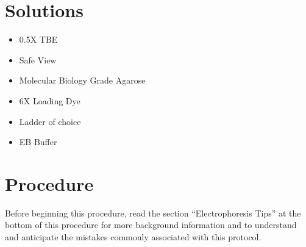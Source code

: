 \documentclass[
  letterpaper,
  DIV=11,
  numbers=noendperiod]{scrreprt}
\providecommand{\tightlist}{%
  \setlength{\itemsep}{0pt}\setlength{\parskip}{0pt}}\usepackage{longtable,booktabs,array}
\begin{document}
\hypertarget{solutions-20}{%
\section{Solutions}\label{solutions-20}}

\begin{itemize}
\tightlist
\item
  0.5X TBE
\item
  Safe View
\item
  Molecular Biology Grade Agarose
\item
  6X Loading Dye
\item
  Ladder of choice
\item
  EB Buffer
\end{itemize}

\hypertarget{procedure-22}{%
\section{Procedure}\label{procedure-22}}

\begin{tcolorbox}[enhanced jigsaw, toprule=.15mm, breakable, coltitle=black, leftrule=.75mm, title=\textcolor{quarto-callout-important-color}{\faExclamation}\hspace{0.5em}{This is important}, bottomrule=.15mm, toptitle=1mm, bottomtitle=1mm, colframe=quarto-callout-important-color-frame, opacityback=0, colback=white, opacitybacktitle=0.6, colbacktitle=quarto-callout-important-color!10!white, rightrule=.15mm, titlerule=0mm, arc=.35mm, left=2mm]

Before beginning this procedure, read the section ``Electrophoresis
Tips'' at the bottom of this procedure for more background information
and to understand and anticipate the mistakes commonly associated with
this protocol.

\end{tcolorbox}
\end{document}
